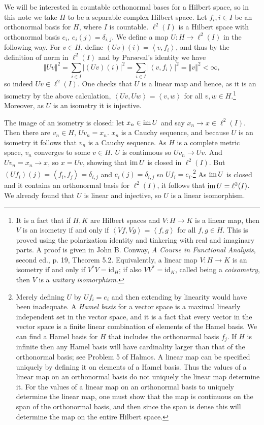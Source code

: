 \documentclass{article}
\newcommand{\inner}[2]{\left\langle #1, #2 \right\rangle}
\newcommand{\im}{\textrm{im\,}}
\newcommand{\id}{\textrm{id}}
\newcommand{\norm}[1]{\left\Vert #1 \right\Vert}
\begin{document}
We will be interested in countable
orthonormal bases for a Hilbert space, so in this note we take $H$ to be a separable complex Hilbert space. 
Let $f_i, i \in I$ be an orthonormal basis for $H$, where $I$ is countable.
$\ell^2(I)$ is a Hilbert space
with orthonormal basis $e_i$, $e_i(j)=\delta_{i,j}$. 
We define a map $U:H \to \ell^2(I)$ in the following way. For $v \in H$,
define $(Uv)(i)=\inner{v}{f_i}$, and thus by the definition of norm in $\ell^2(I)$ and by 
Parseval's identity we have
\[
\norm{Uv}^2=\sum_{i \in I} |(Uv)(i)|^2 = \sum_{i \in I} |\inner{v}{f_i}|^2 = \norm{v}^2 < \infty,
\]
so indeed $Uv \in \ell^2(I)$. One checks that
  $U$ is a linear map and
hence, as it is an isometry by the above calculation, $\inner{Uv}{Uw}=\inner{v}{w}$ for all $v,w \in H$.\footnote{It is a fact that if $H,K$ are Hilbert spaces and $V:H \to K$
is a linear map, then $V$ is an isometry if and only if $\inner{Vf}{Vg}=\inner{f}{g}$ for all $f,g \in H$. This is proved
using the polarization identity and tinkering with real and imaginary parts. A proof is given in John B. Conway, {\em A Course in Functional Analysis},
second ed., p. 19, Theorem 5.2.  Equivalently, a linear map $V:H \to K$ is an isometry if and only if $V^*V=\id_H$; if also
$VV^*=\id_K$, called being a {\em coisometry}, then $V$ is a {\em unitary isomorphism}.}
Moreover, as $U$ is an isometry it is injective.

The image of an isometry is closed: let $x_n \in \im U$ and say $x_n \to x \in \ell^2(I)$. Then there are $v_n \in H$,
$Uv_n=x_n$. $x_n$ is a Cauchy sequence, and because $U$ is an isometry it follows that $v_n$ is a Cauchy
sequence. As $H$ is a complete metric space, $v_n$ converges to some $v \in H$. $U$ is continuous so $Uv_n \to Uv$. And
$Uv_n=x_n \to x$, so 
$x=Uv$, showing that $\im U$ is closed in $\ell^2(I)$. But $(Uf_i)(j)=\inner{f_i}{f_j}=\delta_{i,j}$ and
$e_i(j)=\delta_{i,j}$ so $Uf_i=e_i$.\footnote{Merely defining $U$ by $Uf_i=e_i$ and then extending by linearity would have been inadequate. 
A {\em Hamel basis} for a vector space is a maximal linearly independent set in the vector space, and it is a fact
that every vector in the vector space is a finite linear combination of elements of the Hamel basis. We can
find a Hamel basis for $H$ that includes the orthonormal basis $f_j$. If $H$ is infinite then any Hamel basis will have cardinality larger than that of the orthonormal basis;
see Problem 5 of Halmos.
A linear map can be specified uniquely by defining it on elements of a Hamel basis. Thus the values of a linear map on an orthonormal basis do not uniquely the linear map
determine it. For the values of a linear map on an orthonormal basis to uniquely determine the linear map, 
one must show that the map is continuous on the span of the orthonormal basis, and then since the span is dense this will determine the map on the entire Hilbert space.} As $\im U$ is closed and it contains an orthonormal basis for $\ell^2(I)$, it follows that
$\im U=\ell^2(I)$. We already found that $U$ is linear and injective, so $U$ is a linear isomorphism.
\end{document}
